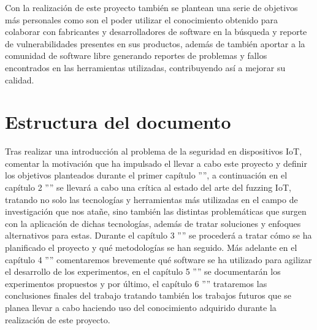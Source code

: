 Con la realización de este proyecto también se plantean una serie de objetivos más personales como son el poder utilizar el conocimiento obtenido 
para colaborar con fabricantes y desarrolladores de software en la búsqueda y reporte de vulnerabilidades presentes en sus productos, además de también
aportar a la comunidad de software libre generando reportes de problemas y fallos encontrados en las herramientas utilizadas, contribuyendo así
a mejorar su calidad. 

\section{Estructura del documento}
Tras realizar una introducción al problema de la seguridad en dispositivos IoT, comentar la motivación que ha impulsado
el llevar a cabo este proyecto y definir los objetivos planteados durante el primer capítulo '''', a continuación en el capítulo 2
'''' se llevará a cabo una crítica al estado del arte del fuzzing IoT, tratando no solo las tecnologías y herramientas 
más utilizadas en el campo de investigación que nos atañe, sino también las distintas problemáticas que surgen con 
la aplicación de dichas tecnologías, además de tratar soluciones y enfoques alternativos para estas.
Durante el capítulo 3 '''' se procederá a tratar cómo se ha planificado el proyecto y qué metodologías se han seguido. Más adelante en el 
capítulo 4 '''' comentaremos brevemente qué software se ha utilizado para agilizar el desarrollo de los experimentos, en el capítulo 5 '''' se documentarán los experimentos propuestos y por último, el capítulo 6 '''' trataremos las conclusiones finales del trabajo tratando también los trabajos futuros que se planea llevar a cabo haciendo uso del conocimiento adquirido durante la realización de este proyecto.